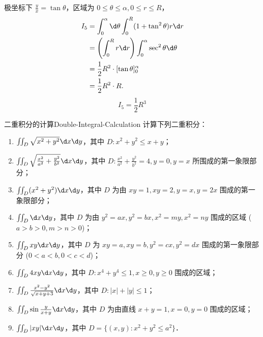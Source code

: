 \begin{solution}
    极坐标下 $\frac{y}{x} = \tan \theta$，区域为 $0 \le \theta \le \alpha, 0 \le r \le R$，
    \begin{equation}
        \begin{aligned}
            I_5 & = \int_{0}^{\alpha} \d \theta \int_{0}^{R} (1 + \tan^2 \theta) r \d r          \\
                & = \left( \int_{0}^{R} r \d r \right) \int_{0}^{\alpha} \sec^2 \theta \d \theta \\
                & = \frac{1}{2} R^2 \cdot [ \tan \theta ]_0^{\alpha}                             \\
                & = \frac{1}{2} R^2 \cdot R.
        \end{aligned}
    \end{equation}
    \begin{equation}
        I_5 = \boxed{\frac{1}{2} R^3}
    \end{equation}
\end{solution}


\begin{problem}{二重积分的计算}{Double-Integral-Calculation}
    计算下列二重积分：
    \begin{enumerate}
        \item $\iint_{D} \sqrt{x^{2}+y^{2}} \d x \d y$，其中 $D: x^{2}+y^{2} \le x+y$；
        \item $\iint_{D} \sqrt{\frac{x^{2}}{a^{2}}+\frac{y^{2}}{b^{2}}} \d x \d y$，其中 $D: \frac{x^{2}}{a^{2}}+\frac{y^{2}}{b^{2}}=4, y=0, y=x$ 所围成的第一象限部分；
        \item $\iint_{D} (x^{2}+y^{2}) \d x \d y$，其中 $D$ 为由 $xy=1, xy=2, y=x, y=2x$ 围成的第一象限部分；
        \item $\iint_{D} \d x \d y$，其中 $D$ 为由 $y^{2}=ax, y^{2}=bx, x^{2}=my, x^{2}=ny$ 围成的区域 ($a>b>0, m>n>0$)；
        \item $\iint_{D} xy \d x \d y$，其中 $D$ 为 $xy=a, xy=b, y^{2}=cx, y^{2}=dx$ 围成的第一象限部分 ($0<a<b, 0<c<d$)；
        \item $\iint_{D} 4xy \d x \d y$，其中 $D: x^{4}+y^{4} \le 1, x \ge 0, y \ge 0$ 围成的区域；
        \item $\iint_{D} \frac{x^{2}-y^{2}}{\sqrt{x+y+3}} \d x \d y$，其中 $D: |x|+|y| \le 1$；
        \item $\iint_{D} \sin \frac{y}{x+y} \d x \d y$，其中 $D$ 为由直线 $x+y=1, x=0, y=0$ 围成的区域；
        \item $\iint_{D} |xy| \d x \d y$，其中 $D = \{(x,y) : x^2 + y^2 \le a^2\}$．
    \end{enumerate}
\end{problem}

